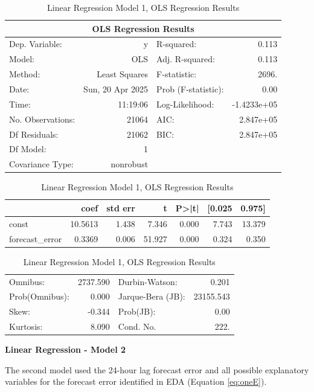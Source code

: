 \documentclass[mstat,12pt]{unswthesis}
\begin{document}
\begin{table}[H]
\caption{Linear Regression Model 1, OLS Regression Results}
\centering
\begin{tabular}{lr|lr}
\hline
\hline
\multicolumn{4}{c}{OLS Regression Results} \\
\hline
\hline
Dep. Variable: & y & R-squared: & 0.113 \\
Model: & OLS & Adj. R-squared: & 0.113 \\
Method: & Least Squares & F-statistic: & 2696. \\
Date: & Sun, 20 Apr 2025 & Prob (F-statistic): & 0.00 \\
Time: & 11:19:06 & Log-Likelihood: & -1.4233e+05 \\
No. Observations: & 21064 & AIC: & 2.847e+05 \\
Df Residuals: & 21062 & BIC: & 2.847e+05 \\
Df Model: & 1 & & \\                                         
Covariance Type: & nonrobust & & \\
\hline
\hline
\end{tabular}

\begin{tabular}{lrrrrrr}
  & coef & std err & t & P>|t| & [0.025 & 0.975] \\
\hline
const & 10.5613 & 1.438 & 7.346 & 0.000 & 7.743 & 13.379 \\
forecast\_error & 0.3369 & 0.006 & 51.927 & 0.000 & 0.324 & 0.350 \\
\hline
\hline
\end{tabular}

\begin{tabular}{lrlr}
Omnibus: & 2737.590 & Durbin-Watson: & 0.201 \\
Prob(Omnibus): & 0.000 & Jarque-Bera (JB): & 23155.543 \\
Skew: & -0.344 & Prob(JB): & 0.00 \\
Kurtosis: & 8.090 & Cond. No. & 222.\\
\hline
\hline
\end{tabular}
\label{tab:tab4}
\end{table}

\noindent \textbf{Linear Regression - Model 2}

\bigskip

\noindent The second model used the 24-hour lag forecast error and all possible explanatory variables for the forecast error identified in EDA (Equation \eqref{eq:oneE}).
\end{document}
